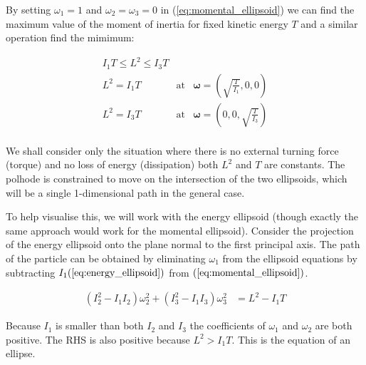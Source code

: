 \documentclass[a4paper, 12pt]{article}
\begin{document}
By setting $\omega_1=1$ and $\omega_2=\omega_3=0$ in (\ref{eq:momental_ellipsoid}) we can find the maximum value of the moment of inertia for fixed kinetic energy $T$ and a similar operation find the mimimum:

\begin{eqnarray*}
  I_1T \leq L^2 \leq I_3 T \\
  L^2=I_1T & \textrm{at} & \mathbf{\omega}=(\sqrt{\frac{T}{I_1}}, 0, 0) \\
  L^2=I_3T & \textrm{at} & \mathbf{\omega}=(0, 0, \sqrt{\frac{T}{I_3}}) \\
\end{eqnarray*}

We shall consider only the situation where there is no external turning force (torque) and no loss of energy (dissipation) both $L^2$ and $T$ are constants. The polhode is constrained to move on the intersection of the two ellipsoids, which will be a single 1-dimensional path in the general case.

To help visualise this, we will work with the energy ellipsoid (though exactly the same approach would work for the momental ellipsoid). Consider the projection of the energy ellipsoid onto the plane normal to the first principal axis. The path of the particle can be obtained by eliminating $\omega_1$ from the ellipsoid equations by subtracting $I_1(\ref{eq:energy_ellipsoid})$ from $(\ref{eq:momental_ellipsoid})$.

\begin{align}
  (I_2^2 - I_1I_2)\omega_2^2 + (I_3^2-I_1I_3)\omega_3^2 & = L^2 - I_1T
\end{align}

Because $I_1$ is smaller than both $I_2$ and $I_3$ the coefficients of $\omega_1$ and $\omega_2$ are both positive. The RHS is also positive because $L^2 > I_1T$. This is the equation of an ellipse.


\begin{center}
  \begin{tikzpicture}%
    
  \end{tikzpicture}
\end{center}
\end{document}
